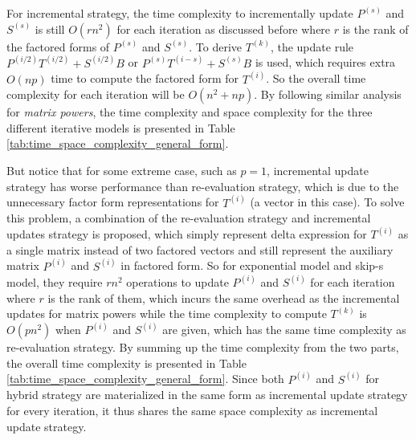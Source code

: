 For incremental strategy, the time complexity to incrementally update $P^{(s)}$ and $S^{(s)}$ is still $O(rn^2)$ for each iteration as discussed before where $r$ is the rank of the factored forms of $P^{(s)}$ and $S^{(s)}$. To derive $T^{(k)}$, the update rule $P^{(i/2)}T^{(i/2)} + S^{(i/2)}B$ or $P^{(s)}T^{(i-s)} + S^{(s)}B$ is used, which requires extra $O(np)$ time to compute the factored form for $T^{(i)}$. So the overall time complexity for each iteration will be $O(n^2 + np)$. By following similar analysis for {\em matrix powers}, the time complexity and space complexity for the three different iterative models is presented in Table \ref{tab:time_space_complexity_general_form}.

But notice that for some extreme case, such as $p=1$, incremental update strategy has worse performance than re-evaluation strategy, which is due to the unnecessary factor form representations for $T^{(i)}$ (a vector in this case). To solve this problem, a combination of the re-evaluation strategy and incremental updates strategy is proposed, which simply represent delta expression for $T^{(i)}$ as a single matrix instead of two factored vectors and still represent the auxiliary matrix $P^{(i)}$ and $S^{(i)}$ in factored form. So for exponential model and skip-s model, they require $rn^2$ operations to update $P^{(i)}$ and $S^{(i)}$ for each iteration where $r$ is the rank of them, which incurs the same overhead as the incremental updates for matrix powers while the time complexity to compute $T^{(k)}$ is $O(pn^2)$ when $P^{(i)}$ and $S^{(i)}$ are given, which has the same time complexity as re-evaluation strategy. By summing up the time complexity from the two parts, the overall time complexity is presented in Table \ref{tab:time_space_complexity_general_form}. Since both $P^{(i)}$ and $S^{(i)}$ for hybrid strategy are materialized in the same form as incremental update strategy for every iteration, it thus shares the same space complexity as incremental update strategy.



